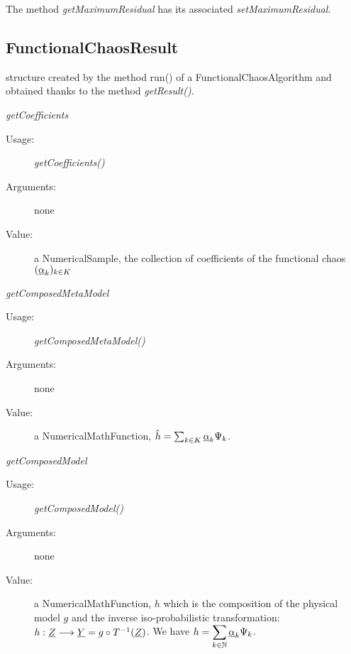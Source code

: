 The method \textit{getMaximumResidual} has its associated \textit{setMaximumResidual}.




\subsection{FunctionalChaosResult}


\begin{description}

\item[Usage:]  structure created by the method run() of a  FunctionalChaosAlgorithm and obtained thanks to the method \textit{getResult()}.


\item[Some methods :]  \rule{0pt}{1em}
\begin{description}

\item \textit{getCoefficients}
\begin{description}
\item[Usage:] \textit{getCoefficients()}
\item[Arguments:] none
\item[Value:] a NumericalSample, the collection of coefficients of the functional chaos $({\underline{\alpha}}_k)_{k\in K}$
\end{description}
\bigskip

\item \textit{getComposedMetaModel}
\begin{description}
\item[Usage:] \textit{getComposedMetaModel()}
\item[Arguments:] none
\item[Value:] a NumericalMathFunction, $\hat{h} =\sum_{k \in K} {\underline{\alpha}}_k \Psi_k$.
\end{description}
\bigskip


\item \textit{getComposedModel}
\begin{description}
\item[Usage:] \textit{getComposedModel()}
\item[Arguments:] none
\item[Value:] a NumericalMathFunction, $h$ which is the composition of the physical model $g$ and the inverse iso-probabilistic transformation: $h : {\underline{Z}} \longrightarrow {\underline{Y}} = g \circ T^{-1}({\underline{Z}})$. We have  $\displaystyle h =  \sum_{k \in {\mathbb N}} {\underline{\alpha}}_k \Psi_k$.
\end{description}
\bigskip


\end{description}
\end{description}
